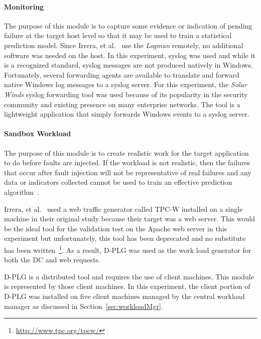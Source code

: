 \paragraph{Monitoring} \label{sec:sandboxMonitoringTool} 
The purpose of this module is to capture some evidence or indication of pending
failure at the target host level so that it may be used to train a statistical
prediction model.  Since Irrera, et al.~\cite{irrera2015} use the \emph{Logman}
remotely, no additional software was needed on the host.  In this experiment,
syslog was used and while it is a recognized standard, syslog messages are not
produced natively in Windows.  Fortunately, several forwarding agents are
available to translate and forward native Windows log messages to a syslog
server.  For this experiment, the \emph{Solar Winds} syslog forwarding tool was
used because of its popularity in the security community and existing presence
on many enterprise networks.  The tool is a lightweight application that simply
forwards Windows events to a syslog server.

\paragraph{Sandbox Workload}  \label{sec:sandboxWorkload} 
The purpose of this module is to create realistic work for the target
application to do before faults are injected.  If the workload is not
realistic, then the failures that occur after fault injection will not be
representative of real failures and any data or indicators collected cannot be
used to train an effective prediction
algorithm~\cite{cotroneo2012,irrera2015,kikuchi2014}.

Irrera, et al.~\cite{irrera2015} used a web traffic generator called TPC-W
installed on a single machine in their original study because their target was
a web server.  This would be the ideal tool for the validation test on the
Apache web server in this experiment but unfortunately, this tool has been
deprecated and no substitute has been
written~\footnote{\url{http://www.tpc.org/tpcw/}}.  As a result, \ac{D-PLG} was
used as the work load generator for both the \ac{DC} and web requests.

\ac{D-PLG} is a distributed tool and requires the use of client machines.  This
module is represented by those client machines.  In this experiment, the client
portion of \ac{D-PLG} was installed on five client machines managed by the
central workload manager as discussed in Section~\ref{sec:workloadMgr}.

